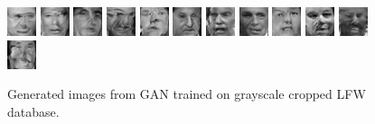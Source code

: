 \begin{figure}[!h]
    \centerline{
        \includegraphics[scale=1]{figures/lfw/appendix1/lfw32x32bw_image0000.png}
        \includegraphics[scale=1]{figures/lfw/appendix1/lfw32x32bw_image0001.png}
        \includegraphics[scale=1]{figures/lfw/appendix1/lfw32x32bw_image0002.png}
        \includegraphics[scale=1]{figures/lfw/appendix1/lfw32x32bw_image0003.png}
        \includegraphics[scale=1]{figures/lfw/appendix1/lfw32x32bw_image0004.png}
        \includegraphics[scale=1]{figures/lfw/appendix1/lfw32x32bw_image0005.png}
        \includegraphics[scale=1]{figures/lfw/appendix1/lfw32x32bw_image0006.png}
        \includegraphics[scale=1]{figures/lfw/appendix1/lfw32x32bw_image0007.png}
        \includegraphics[scale=1]{figures/lfw/appendix1/lfw32x32bw_image0008.png}
        \includegraphics[scale=1]{figures/lfw/appendix1/lfw32x32bw_image0009.png}
        \includegraphics[scale=1]{figures/lfw/appendix1/lfw32x32bw_image0010.png}
        \includegraphics[scale=1]{figures/lfw/appendix1/lfw32x32bw_image0011.png}
    }
    \caption{\label{fig:lfw-32x32bw}Generated images from GAN trained on grayscale cropped LFW database.}
\end{figure}

